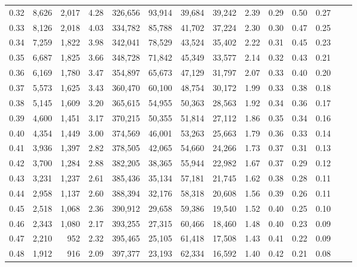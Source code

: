 \begin{tabular}{rrrrrrrrrrrrrr}
0.32 &   8,626 &  2,017 &    4.28 &  326,656 &   93,914 &  39,684 &  39,242 &  2.39 &  0.29 &  0.50 &      0.27 \\
0.33 &   8,126 &  2,018 &    4.03 &  334,782 &   85,788 &  41,702 &  37,224 &  2.30 &  0.30 &  0.47 &      0.25 \\
0.34 &   7,259 &  1,822 &    3.98 &  342,041 &   78,529 &  43,524 &  35,402 &  2.22 &  0.31 &  0.45 &      0.23 \\
0.35 &   6,687 &  1,825 &    3.66 &  348,728 &   71,842 &  45,349 &  33,577 &  2.14 &  0.32 &  0.43 &      0.21 \\
0.36 &   6,169 &  1,780 &    3.47 &  354,897 &   65,673 &  47,129 &  31,797 &  2.07 &  0.33 &  0.40 &      0.20 \\
0.37 &   5,573 &  1,625 &    3.43 &  360,470 &   60,100 &  48,754 &  30,172 &  1.99 &  0.33 &  0.38 &      0.18 \\
0.38 &   5,145 &  1,609 &    3.20 &  365,615 &   54,955 &  50,363 &  28,563 &  1.92 &  0.34 &  0.36 &      0.17 \\
0.39 &   4,600 &  1,451 &    3.17 &  370,215 &   50,355 &  51,814 &  27,112 &  1.86 &  0.35 &  0.34 &      0.16 \\
0.40 &   4,354 &  1,449 &    3.00 &  374,569 &   46,001 &  53,263 &  25,663 &  1.79 &  0.36 &  0.33 &      0.14 \\
0.41 &   3,936 &  1,397 &    2.82 &  378,505 &   42,065 &  54,660 &  24,266 &  1.73 &  0.37 &  0.31 &      0.13 \\
0.42 &   3,700 &  1,284 &    2.88 &  382,205 &   38,365 &  55,944 &  22,982 &  1.67 &  0.37 &  0.29 &      0.12 \\
0.43 &   3,231 &  1,237 &    2.61 &  385,436 &   35,134 &  57,181 &  21,745 &  1.62 &  0.38 &  0.28 &      0.11 \\
0.44 &   2,958 &  1,137 &    2.60 &  388,394 &   32,176 &  58,318 &  20,608 &  1.56 &  0.39 &  0.26 &      0.11 \\
0.45 &   2,518 &  1,068 &    2.36 &  390,912 &   29,658 &  59,386 &  19,540 &  1.52 &  0.40 &  0.25 &      0.10 \\
0.46 &   2,343 &  1,080 &    2.17 &  393,255 &   27,315 &  60,466 &  18,460 &  1.48 &  0.40 &  0.23 &      0.09 \\
0.47 &   2,210 &    952 &    2.32 &  395,465 &   25,105 &  61,418 &  17,508 &  1.43 &  0.41 &  0.22 &      0.09 \\
0.48 &   1,912 &    916 &    2.09 &  397,377 &   23,193 &  62,334 &  16,592 &  1.40 &  0.42 &  0.21 &      0.08 \\

\end{tabular}
